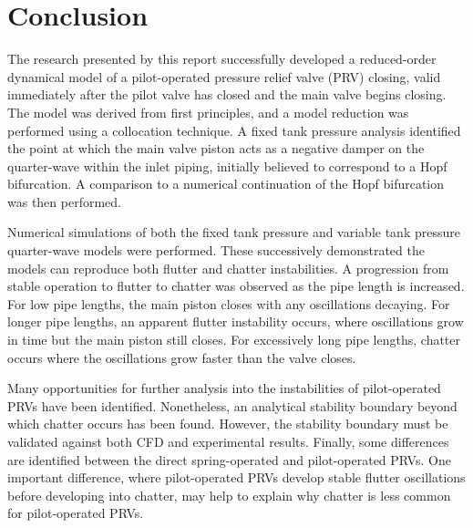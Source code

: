 \chapter{Conclusion}

The research presented by this report successfully developed a reduced-order dynamical model of a pilot-operated pressure relief valve (PRV) closing, valid immediately after the pilot valve has closed and the main valve begins closing. The model was derived from first principles, and a model reduction was performed using a collocation technique. A fixed tank pressure analysis identified the point at which the main valve piston acts as a negative damper on the quarter-wave within the inlet piping, initially believed to correspond to a Hopf bifurcation. A comparison to a numerical continuation of the Hopf bifurcation was then performed.

Numerical simulations of both the fixed tank pressure and variable tank pressure quarter-wave models were performed. These successively demonstrated the models can reproduce both flutter and chatter instabilities. A progression from stable operation to flutter to chatter was observed as the pipe length is increased. For low pipe lengths, the main piston closes with any oscillations decaying. For longer pipe lengths, an apparent flutter instability occurs, where oscillations grow in time but the main piston still closes. For excessively long pipe lengths, chatter occurs where the oscillations grow faster than the valve closes.

Many opportunities for further analysis into the instabilities of pilot-operated PRVs have been identified. Nonetheless, an analytical stability boundary beyond which chatter occurs has been found. However, the stability boundary must be validated against both CFD and experimental results. Finally, some differences are identified between the direct spring-operated and pilot-operated PRVs. One important difference, where pilot-operated PRVs develop stable flutter oscillations before developing into chatter, may help to explain why chatter is less common for pilot-operated PRVs.